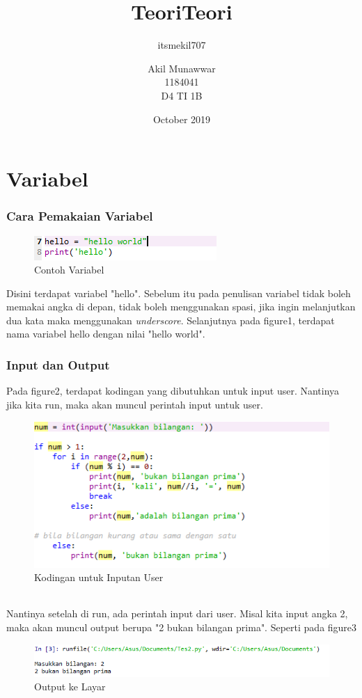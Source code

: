 \documentclass{article}
\title{Teori}
\author{itsmekil707}
\date{October 2019}
\begin{document}
\title{Teori}
\author{Akil Munawwar \\ 1184041 \\ D4 TI 1B}

\maketitle

\part{Variabel}
\section{Cara Pemakaian Variabel}
\begin{figure}[!htbp]
    \centering
    \includegraphics[scale=1]{Variabel.PNG}
    \caption{Contoh Variabel}
\end{figure}
Disini terdapat variabel "hello". Sebelum itu pada penulisan variabel tidak boleh memakai angka di depan, tidak boleh menggunakan spasi, jika ingin melanjutkan dua kata maka menggunakan \textit{underscore}. Selanjutnya pada figure1, terdapat nama variabel hello dengan nilai "hello world".
\newpage

\section{Input dan Output}
Pada figure2, terdapat kodingan yang dibutuhkan untuk input user. Nantinya jika kita run, maka akan muncul perintah input untuk user.
\begin{figure}[!htbp]
    \centering
    \includegraphics[scale=1]{Inputan.PNG}
    \caption{Kodingan untuk Inputan User}
\end{figure}
\paragraph{}
Nantinya setelah di run, ada perintah input dari user. Misal kita input angka 2, maka akan muncul output berupa "2 bukan bilangan prima". Seperti pada figure3
\begin{figure}[!htbp]
    \centering
    \includegraphics[scale=0.4]{Output.PNG}
    \caption{Output ke Layar}
\end{figure}
\newpage
\end{document}
